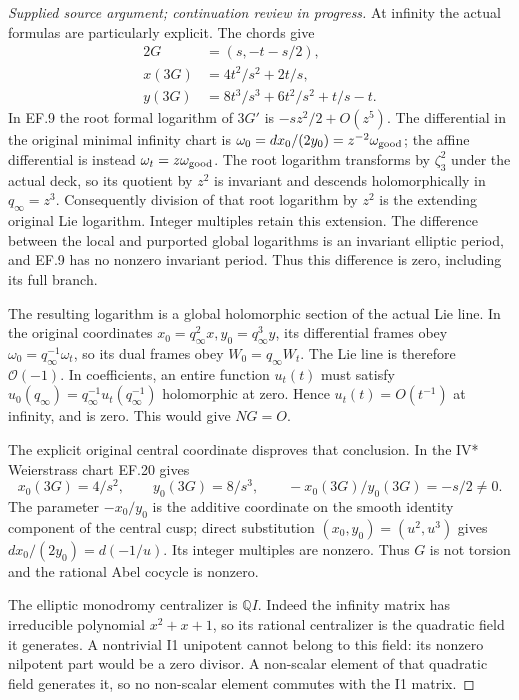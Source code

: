 \begin{proof}[Supplied source argument; continuation review in progress]
At infinity the actual formulas are particularly explicit. The chords
give
\[
 \begin{split}
 2G&=(s,-t-s/2),\\
 x(3G)&=4t^2/s^2+2t/s,\\
 y(3G)&=8t^3/s^3+6t^2/s^2+t/s-t.
 \end{split}                                                    \tag{EF.20}
\]
In EF.9 the root formal logarithm of \(3G'\) is
\(-s z^2/2+O(z^5)\). The differential in the original minimal infinity chart is
\(\omega_0=dx_0/(2y_0)=z^{-2}\omega_{\rm good}\); the affine
differential is instead \(\omega_t=z\omega_{\rm good}\). The
root logarithm transforms by \(\zeta_3^2\) under the actual deck,
so its quotient by \(z^2\) is invariant and descends holomorphically
in \(q_\infty=z^3\). Consequently division
of that root logarithm by \(z^2\) is the extending original Lie
logarithm. Integer multiples retain this extension. The difference
between the local and purported global logarithms is an invariant
elliptic period, and EF.9 has no nonzero invariant period. Thus this
difference is zero, including its full branch.

The resulting logarithm is a global holomorphic section of the actual
Lie line. In the original coordinates
\(x_0=q_\infty^2x,y_0=q_\infty^3y\), its differential frames obey
\(\omega_0=q_\infty^{-1}\omega_t\), so its dual frames obey
\(W_0=q_\infty W_t\). The Lie line is therefore \(\mathcal O(-1)\).
In coefficients, an entire function \(u_t(t)\) must satisfy
\(u_0(q_\infty)=q_\infty^{-1}u_t(q_\infty^{-1})\) holomorphic
at zero. Hence \(u_t(t)=O(t^{-1})\) at infinity, and is zero.
This would give \(NG=O\).

The explicit original central coordinate disproves that conclusion.
In the IV* Weierstrass chart EF.20 gives
\[
 x_0(3G)=4/s^2,\qquad y_0(3G)=8/s^3,\qquad
                 -x_0(3G)/y_0(3G)=-s/2\ne0.
 \tag{EF.21}
\]
The parameter \(-x_0/y_0\) is the additive coordinate on the smooth
identity component of the central cusp; direct substitution
\((x_0,y_0)=(u^2,u^3)\) gives
\(dx_0/(2y_0)=d(-1/u)\). Its integer multiples are nonzero.
Thus \(G\) is not torsion and the rational Abel cocycle is nonzero.

The elliptic monodromy centralizer is \(\mathbb Q I\). Indeed the
infinity matrix has irreducible polynomial \(x^2+x+1\), so its
rational centralizer is the quadratic field it generates. A nontrivial
I1 unipotent cannot belong to this field: its nonzero nilpotent part
would be a zero divisor. A non-scalar element of that quadratic field
generates it, so no non-scalar element commutes with the I1 matrix.


\end{proof}
